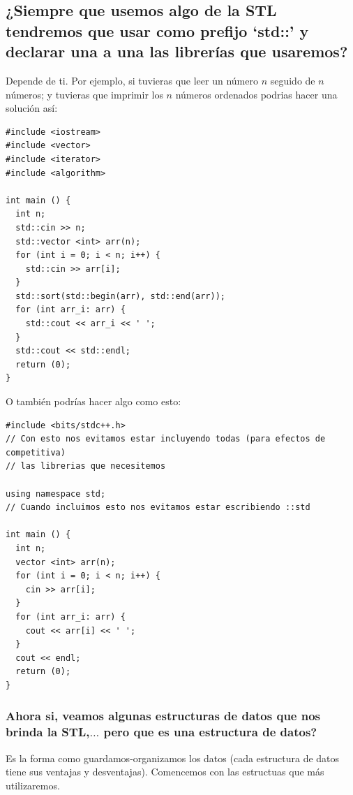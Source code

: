 \documentclass[a4paper,12pt]{article}
\begin{document}
\subsection*{¿Siempre que usemos algo de la STL tendremos que usar como prefijo `std::' y declarar una a una las librerías que usaremos?}
Depende de ti. Por ejemplo, si tuvieras que leer un número $n$ seguido de $n$ números; y tuvieras que imprimir los $n$ números ordenados podrias hacer una solución así:
\begin{lstlisting}
#include <iostream>
#include <vector>
#include <iterator>
#include <algorithm>

int main () {
  int n;
  std::cin >> n;
  std::vector <int> arr(n);
  for (int i = 0; i < n; i++) {
    std::cin >> arr[i];
  }
  std::sort(std::begin(arr), std::end(arr));
  for (int arr_i: arr) {
    std::cout << arr_i << ' ';
  }
  std::cout << std::endl;
  return (0);
}
\end{lstlisting} 
O también podrías hacer algo como esto:
\begin{lstlisting}
#include <bits/stdc++.h>
// Con esto nos evitamos estar incluyendo todas (para efectos de competitiva)
// las librerias que necesitemos

using namespace std;
// Cuando incluimos esto nos evitamos estar escribiendo ::std

int main () {
  int n;
  vector <int> arr(n);
  for (int i = 0; i < n; i++) {
    cin >> arr[i];
  }
  for (int arr_i: arr) {
    cout << arr[i] << ' ';
  }
  cout << endl;
  return (0);
}
\end{lstlisting}
\subsubsection*{Ahora si, veamos algunas estructuras de datos que nos brinda la STL,$\ldots$ pero que es una estructura de datos?}
Es la forma como guardamos-organizamos los datos (cada estructura de datos tiene sus ventajas y desventajas). Comencemos con las estructuas que más utilizaremos.
\end{document}
